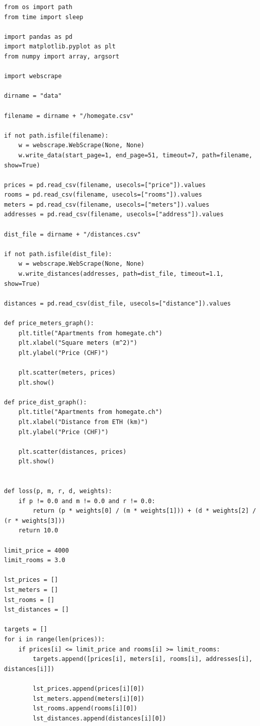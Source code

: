 \documentclass[12pt]{article}
\begin{document}
\lstset{language=Python}
\begin{lstlisting}
from os import path
from time import sleep

import pandas as pd
import matplotlib.pyplot as plt
from numpy import array, argsort

import webscrape

dirname = "data"

filename = dirname + "/homegate.csv"

if not path.isfile(filename):
    w = webscrape.WebScrape(None, None)
    w.write_data(start_page=1, end_page=51, timeout=7, path=filename, show=True)

prices = pd.read_csv(filename, usecols=["price"]).values
rooms = pd.read_csv(filename, usecols=["rooms"]).values
meters = pd.read_csv(filename, usecols=["meters"]).values
addresses = pd.read_csv(filename, usecols=["address"]).values

dist_file = dirname + "/distances.csv"

if not path.isfile(dist_file):
    w = webscrape.WebScrape(None, None)
    w.write_distances(addresses, path=dist_file, timeout=1.1, show=True)

distances = pd.read_csv(dist_file, usecols=["distance"]).values

def price_meters_graph():
    plt.title("Apartments from homegate.ch")
    plt.xlabel("Square meters (m^2)")
    plt.ylabel("Price (CHF)")

    plt.scatter(meters, prices)
    plt.show()

def price_dist_graph():
    plt.title("Apartments from homegate.ch")
    plt.xlabel("Distance from ETH (km)")
    plt.ylabel("Price (CHF)")

    plt.scatter(distances, prices)
    plt.show()


def loss(p, m, r, d, weights):
    if p != 0.0 and m != 0.0 and r != 0.0:
        return (p * weights[0] / (m * weights[1])) + (d * weights[2] /  (r * weights[3]))
    return 10.0

limit_price = 4000
limit_rooms = 3.0

lst_prices = []
lst_meters = []
lst_rooms = []
lst_distances = []

targets = []
for i in range(len(prices)):
    if prices[i] <= limit_price and rooms[i] >= limit_rooms:
        targets.append([prices[i], meters[i], rooms[i], addresses[i], distances[i]])

        lst_prices.append(prices[i][0])
        lst_meters.append(meters[i][0])
        lst_rooms.append(rooms[i][0])
        lst_distances.append(distances[i][0])


\end{lstlisting}
\end{document}
